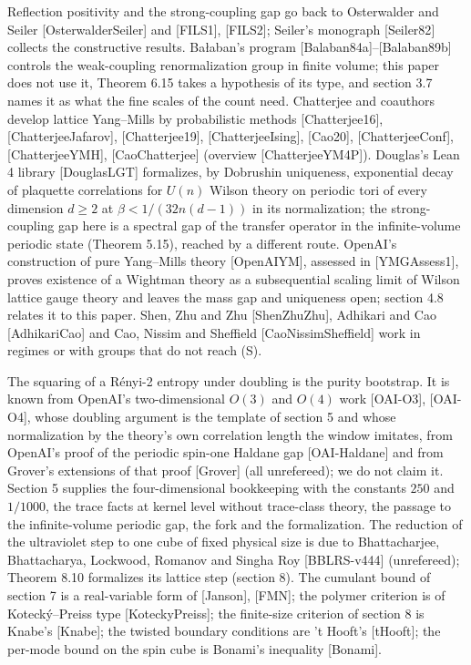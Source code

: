 \documentclass[10pt,letterpaper,twocolumn]{article}
\begin{document}
Reflection positivity and the strong-coupling gap go back to Osterwalder and Seiler {[}OsterwalderSeiler{]} and {[}FILS1{]}, {[}FILS2{]}; Seiler's monograph {[}Seiler82{]} collects the constructive results. Bałaban's program {[}\allowbreak{}Balaban8\allowbreak{}4a{]}\allowbreak{}--{[}\allowbreak{}Balaban8\allowbreak{}9b{]} controls the weak-coupling renormalization group in finite volume; this paper does not use it, Theorem 6.15 takes a hypothesis of its type, and section 3.7 names it as what the fine scales of the count need. Chatterjee and coauthors develop lattice Yang--Mills by probabilistic methods {[}Chatterjee16{]}, {[}ChatterjeeJafarov{]}, {[}Chatterjee19{]}, {[}ChatterjeeIsing{]}, {[}Cao20{]}, {[}ChatterjeeConf{]}, {[}ChatterjeeYMH{]}, {[}CaoChatterjee{]} (overview {[}ChatterjeeYM4P{]}). Douglas's Lean 4 library {[}DouglasLGT{]} formalizes, by Dobrushin uniqueness, exponential decay of plaquette correlations for \(U(n)\) Wilson theory on periodic tori of every dimension \(d\ge2\) at \(\beta<1/(32n(d-1))\) in its normalization; the strong-coupling gap here is a spectral gap of the transfer operator in the infinite-volume periodic state (Theorem 5.15), reached by a different route. OpenAI's construction of pure Yang--Mills theory {[}OpenAIYM{]}, assessed in {[}YMGAssess1{]}, proves existence of a Wightman theory as a subsequential scaling limit of Wilson lattice gauge theory and leaves the mass gap and uniqueness open; section 4.8 relates it to this paper. Shen, Zhu and Zhu {[}ShenZhuZhu{]}, Adhikari and Cao {[}AdhikariCao{]} and Cao, Nissim and Sheffield {[}CaoNissimSheffield{]} work in regimes or with groups that do not reach (S).

The squaring of a Rényi-2 entropy under doubling is the purity bootstrap. It is known from OpenAI's two-dimensional \(O(3)\) and \(O(4)\) work {[}OAI-O3{]}, {[}OAI-O4{]}, whose doubling argument is the template of section 5 and whose normalization by the theory's own correlation length the window imitates, from OpenAI's proof of the periodic spin-one Haldane gap {[}OAI-Haldane{]} and from Grover's extensions of that proof {[}Grover{]} (all unrefereed); we do not claim it. Section 5 supplies the four-dimensional bookkeeping with the constants \(250\) and \(1/1000\), the trace facts at kernel level without trace-class theory, the passage to the infinite-volume periodic gap, the fork and the formalization. The reduction of the ultraviolet step to one cube of fixed physical size is due to Bhattacharjee, Bhattacharya, Lockwood, Romanov and Singha Roy {[}BBLRS-v444{]} (unrefereed); Theorem 8.10 formalizes its lattice step (section 8). The cumulant bound of section 7 is a real-variable form of {[}Janson{]}, {[}FMN{]}; the polymer criterion is of Kotecký--Preiss type {[}KoteckyPreiss{]}; the finite-size criterion of section 8 is Knabe's {[}Knabe{]}; the twisted boundary conditions are 't Hooft's {[}tHooft{]}; the per-mode bound on the spin cube is Bonami's inequality {[}Bonami{]}.
\end{document}
